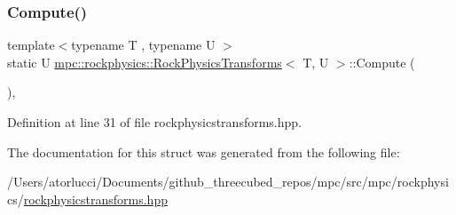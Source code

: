 \subsubsection{\texorpdfstring{Compute()}{Compute()}}
{\footnotesize\ttfamily template$<$typename T , typename U $>$ \\
static U \mbox{\hyperlink{structmpc_1_1rockphysics_1_1_rock_physics_transforms}{mpc\+::rockphysics\+::\+Rock\+Physics\+Transforms}}$<$ T, U $>$\+::Compute (\begin{DoxyParamCaption}{ }\end{DoxyParamCaption})\hspace{0.3cm}{\ttfamily [inline]}, {\ttfamily [static]}}



Definition at line 31 of file rockphysicstransforms.\+hpp.



The documentation for this struct was generated from the following file\+:\begin{DoxyCompactItemize}
\item 
/\+Users/atorlucci/\+Documents/github\+\_\+threecubed\+\_\+repos/mpc/src/mpc/rockphysics/\mbox{\hyperlink{rockphysicstransforms_8hpp}{rockphysicstransforms.\+hpp}}\end{DoxyCompactItemize}
